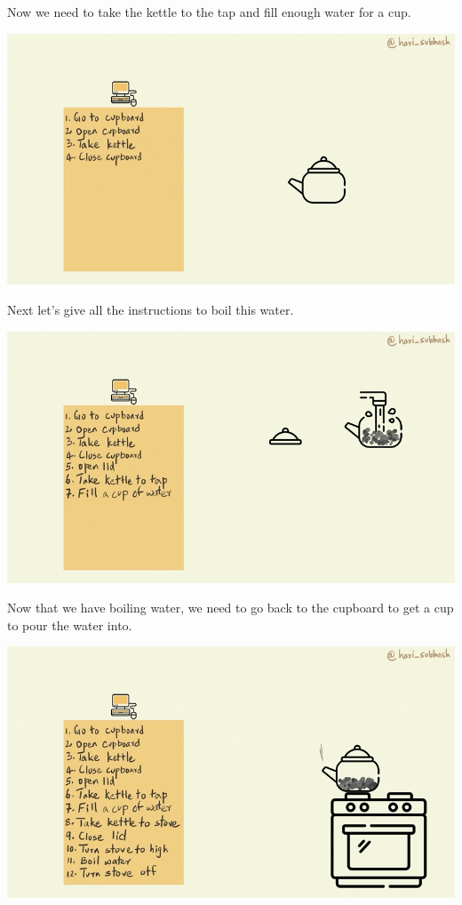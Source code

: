 \documentclass[
]{book}
\begin{document}
Now we need to take the kettle to the tap and fill enough water for a cup.

\includegraphics{assets/ch_3-functions/gifs/fill_water.gif}

Next let's give all the instructions to boil this water.

\includegraphics{assets/ch_3-functions/gifs/boil_water.gif}

Now that we have boiling water, we need to go back to the cupboard to get a cup to pour the water into.

\includegraphics{assets/ch_3-functions/gifs/get_cup.gif}
\end{document}
